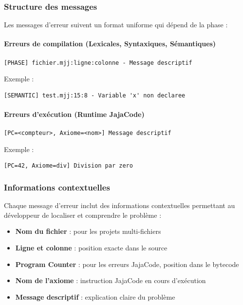 \subsubsection{Structure des messages}

Les messages d'erreur suivent un format uniforme qui dépend de la phase :

\paragraph{Erreurs de compilation (Lexicales, Syntaxiques, Sémantiques)}

\vspace{0.3cm}
\begin{lstlisting}[caption=Format des erreurs de compilation,label={lst:ex-err-compil}]
[PHASE] fichier.mjj:ligne:colonne - Message descriptif
\end{lstlisting}

Exemple :
\begin{lstlisting}[caption=Exemple d'erreur sémantique,label={lst:ex-err-semantique}]
[SEMANTIC] test.mjj:15:8 - Variable 'x' non declaree
\end{lstlisting}

\paragraph{Erreurs d'exécution (Runtime JajaCode)}

\vspace{0.3cm}
\begin{lstlisting}[caption=Format des erreurs d'execution,label={lst:ex-err-runtime}]
[PC=<compteur>, Axiome=<nom>] Message descriptif
\end{lstlisting}

Exemple :
\begin{lstlisting}[caption=Exemple d'erreur d'execution,label={lst:ex-err-execution}]
[PC=42, Axiome=div] Division par zero
\end{lstlisting}

\subsubsection{Informations contextuelles}

Chaque message d'erreur inclut des informations contextuelles permettant au développeur de localiser et comprendre le problème :
\begin{itemize}
    \item \textbf{Nom du fichier} : pour les projets multi-fichiers
    \item \textbf{Ligne et colonne} : position exacte dans le source
    \item \textbf{Program Counter} : pour les erreurs JajaCode, position dans le bytecode
    \item \textbf{Nom de l'axiome} : instruction JajaCode en cours d'exécution
    \item \textbf{Message descriptif} : explication claire du problème
\end{itemize}

